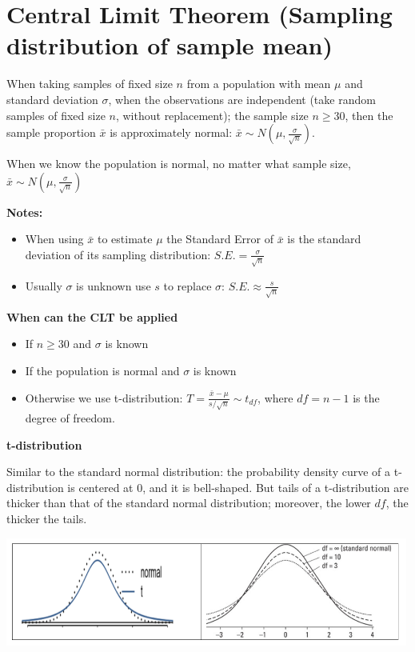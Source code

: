 \documentclass[
]{book}
\providecommand{\tightlist}{%
  \setlength{\itemsep}{0pt}\setlength{\parskip}{0pt}}
\begin{document}
\section{Central Limit Theorem (Sampling distribution of sample mean)}\label{central-limit-theorem-sampling-distribution-of-sample-mean}

When taking samples of fixed size \(n\) from a population with mean \(\mu\) and standard deviation \(\sigma\), when the observations are independent (take random samples of fixed size \(n\), without replacement); the sample size \(n \geq 30\), then the sample proportion \(\bar{x}\) is approximately normal: \(\bar{x} \sim N(\mu, \frac{\sigma}{\sqrt{n}})\).

When we know the population is normal, no matter what sample size, \(\bar{x} \sim N(\mu, \frac{\sigma}{\sqrt{n}})\)

\textbf{Notes:}

\begin{itemize}
\tightlist
\item
  When using \(\bar{x}\) to estimate \(\mu\) the Standard Error of \(\bar{x}\) is the standard deviation of its sampling distribution: \(S.E. = \frac{\sigma}{\sqrt{n}}\)
\item
  Usually \(\sigma\) is unknown use \(s\) to replace \(\sigma\): \(S.E. \approx \frac{s}{\sqrt{n}}\)
\end{itemize}

\textbf{When can the CLT be applied}

\begin{itemize}
\tightlist
\item
  If \(n \geq 30\) and \(\sigma\) is known
\item
  If the population is normal and \(\sigma\) is known
\item
  Otherwise we use t-distribution: \(T = \frac{\bar{x} - \mu}{s/\sqrt{n}} \sim t_{df}\), where \(df=n-1\) is the degree of freedom.
\end{itemize}

\textbf{t-distribution}

Similar to the standard normal distribution: the probability density curve of a t-distribution is centered at 0, and it is bell-shaped. But tails of a t-distribution are thicker than that of the standard normal distribution; moreover, the lower \(df\), the thicker the tails.

\includegraphics[width=5.20833in,height=\textheight]{images/img52.png}
\end{document}
